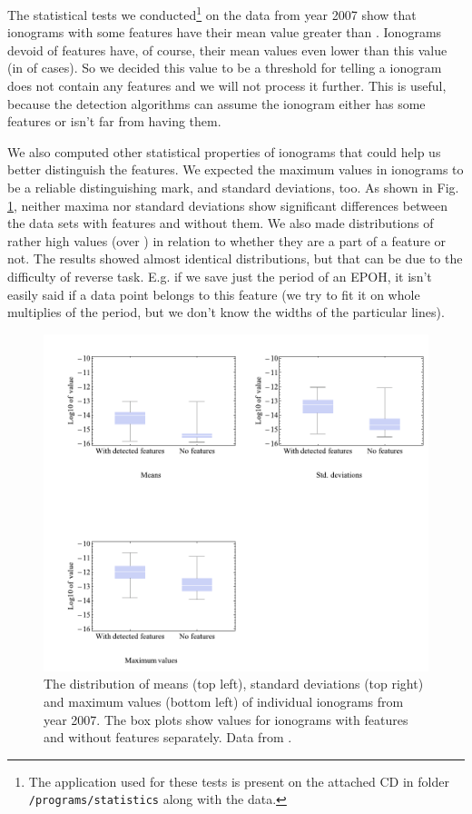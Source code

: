 The statistical tests we conducted\footnote{The application used for these tests is present on the attached CD in folder \texttt{/programs/statistics} along with the data.} on the data from year 2007 show that  ionograms with some features have their mean value greater than . Ionograms devoid of features have, of course, their mean values even lower than this value (in  of cases). So we decided this value to be a threshold for telling a ionogram does not contain any features and we will not process it further. This is useful, because the detection algorithms can assume the ionogram either has some features or isn't far from having them.

We also computed other statistical properties of ionograms that could help us better distinguish the features. We expected the maximum values in ionograms to be a reliable distinguishing mark, and standard deviations, too. As shown in Fig. \ref{fig:data_stats}, neither maxima nor standard deviations show significant differences between the data sets with features and without them. We also made distributions of rather high values (over ) in relation to whether they are a part of a feature or not. The results showed almost identical distributions, but that can be due to the difficulty of reverse task. E.g. if we save just the period of an EPOH, it isn't easily said if a data point belongs to this feature (we try to fit it on whole multiplies of the period, but we don't know the widths of the particular lines). 

\begin{figure}
	\centering
	\includegraphics[width=140mm]{images/data_stats.pdf}
	\caption{The distribution of means (top left), standard deviations (top right) and maximum values (bottom left) of individual ionograms from year 2007. The box plots show values for ionograms with features and without features separately. Data from \citep{FTP}.}
	\label{fig:data_stats}
\end{figure}


